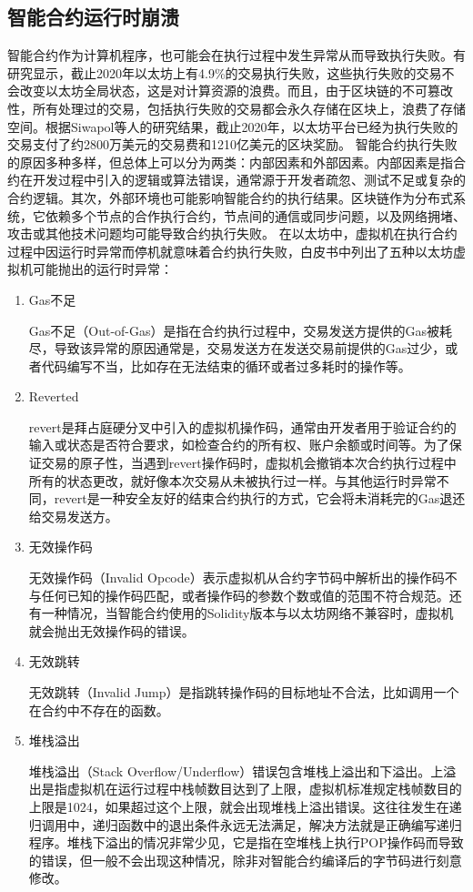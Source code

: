 \subsection{智能合约运行时崩溃}
\label{sec:智能合约运行时崩溃}
智能合约作为计算机程序，也可能会在执行过程中发生异常从而导致执行失败。有研究显示，截止2020年以太坊上有4.9\%的交易执行失败，这些执行失败的交易不会改变以太坊全局状态，这是对计算资源的浪费。而且，由于区块链的不可篡改性，所有处理过的交易，包括执行失败的交易都会永久存储在区块上，浪费了存储空间。根据Siwapol等人的研究结果，截止2020年，以太坊平台已经为执行失败的交易支付了约2800万美元的交易费和1210亿美元的区块奖励。
智能合约执行失败的原因多种多样，但总体上可以分为两类：内部因素和外部因素。内部因素是指合约在开发过程中引入的逻辑或算法错误，通常源于开发者疏忽、测试不足或复杂的合约逻辑。其次，外部环境也可能影响智能合约的执行结果。区块链作为分布式系统，它依赖多个节点的合作执行合约，节点间的通信或同步问题，以及网络拥堵、攻击或其他技术问题均可能导致合约执行失败。
在以太坊中，虚拟机在执行合约过程中因运行时异常而停机就意味着合约执行失败，白皮书中列出了五种以太坊虚拟机可能抛出的运行时异常：
\begin{enumerate}[label=\Alph*., align=left, leftmargin=*]
    \item Gas不足
    
    Gas不足（Out-of-Gas）是指在合约执行过程中，交易发送方提供的Gas被耗尽，导致该异常的原因通常是，交易发送方在发送交易前提供的Gas过少，或者代码编写不当，比如存在无法结束的循环或者过多耗时的操作等。
    \item Reverted
    
    revert是拜占庭硬分叉中引入的虚拟机操作码，通常由开发者用于验证合约的输入或状态是否符合要求，如检查合约的所有权、账户余额或时间等。为了保证交易的原子性，当遇到revert操作码时，虚拟机会撤销本次合约执行过程中所有的状态更改，就好像本次交易从未被执行过一样。与其他运行时异常不同，revert是一种安全友好的结束合约执行的方式，它会将未消耗完的Gas退还给交易发送方。
    \item 无效操作码
    
    无效操作码（Invalid Opcode）表示虚拟机从合约字节码中解析出的操作码不与任何已知的操作码匹配，或者操作码的参数个数或值的范围不符合规范。还有一种情况，当智能合约使用的Solidity版本与以太坊网络不兼容时，虚拟机就会抛出无效操作码的错误。
    \item 无效跳转
    
    无效跳转（Invalid Jump）是指跳转操作码的目标地址不合法，比如调用一个在合约中不存在的函数。
    \item 堆栈溢出
    
    堆栈溢出（Stack Overflow/Underflow）错误包含堆栈上溢出和下溢出。上溢出是指虚拟机在运行过程中栈帧数目达到了上限，虚拟机标准规定栈帧数目的上限是1024，如果超过这个上限，就会出现堆栈上溢出错误。这往往发生在递归调用中，递归函数中的退出条件永远无法满足，解决方法就是正确编写递归程序。堆栈下溢出的情况非常少见，它是指在空堆栈上执行POP操作码而导致的错误，但一般不会出现这种情况，除非对智能合约编译后的字节码进行刻意修改。
\end{enumerate}
